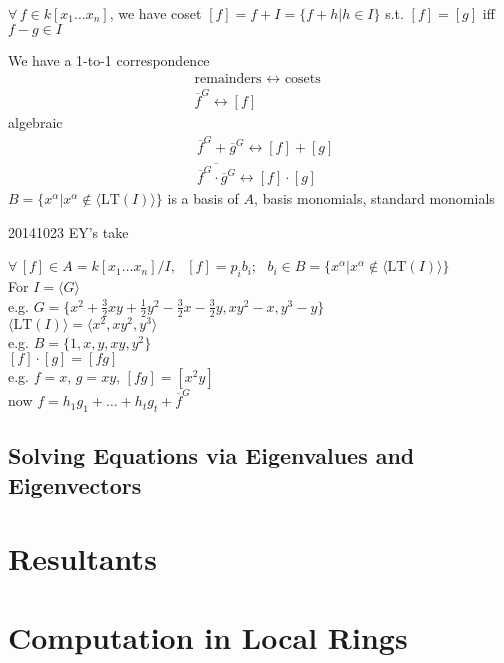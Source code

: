 \documentclass[10pt]{amsart}
\begin{document}
\begin{multicols*}{2}
$\forall \, f \in k[x_1\dots x_n]$, we have coset $[f] = f+I = \lbrace f +h|h\in I\rbrace$ s.t. $[f]=[g]$ iff $f- g \in I$

We have a 1-to-1 correspondence 
\[
\begin{gathered}
\text{remainders } \leftrightarrow \text{ cosets } \\
\overline{f}^G \leftrightarrow [f]
\end{gathered}
\]
algebraic
\[
\begin{aligned}
  & \overline{f}^G + \overline{g}^G \leftrightarrow [f] + [g] \\ 
  & \overline{ \overline{f}^G \cdot \overline{g}^G } \leftrightarrow [f]\cdot [g]
\end{aligned}
\]
$B = \lbrace x^{\alpha} | x^{\alpha} \notin \langle \text{LT}(I) \rangle \rbrace$ is a basis of $A$, basis monomials, standard monomials

20141023 EY's take

$\forall \, [f] \in A = k[x_1 \dots x_n]/I$, \, $[f] = p_ib_i$; \, $b_i \in B = \lbrace x^{\alpha} | x^{\alpha} \notin \langle \text{LT}(I) \rangle \rbrace$ \\
For $I = \langle G \rangle$ \\
\phantom{\quad } e.g. $G=\lbrace x^2 + \frac{3}{2} xy + \frac{1}{2} y^2 - \frac{3}{2} x - \frac{3}{2} y, xy^2-x, y^3-y \rbrace$ \\
$\langle \text{LT}(I) \rangle = \langle x^2, xy^2,y^3 \rangle$ \\
e.g. $B=\lbrace 1,x,y,xy,y^2\rbrace$ \\
\phantom{\quad } $[f]\cdot[g] = [fg]$ \\
e.g. $f=x, \, g=xy, \, [fg] = [x^2y]$ \\
now $f=h_1g_1 + \dots +h_tg_t+ \overline{f}^G$

\subsection{}

\subsection{Solving Equations via Eigenvalues and Eigenvectors}


\section{ Resultants }

\section{Computation in Local Rings}


\end{multicols*}
\end{document}
